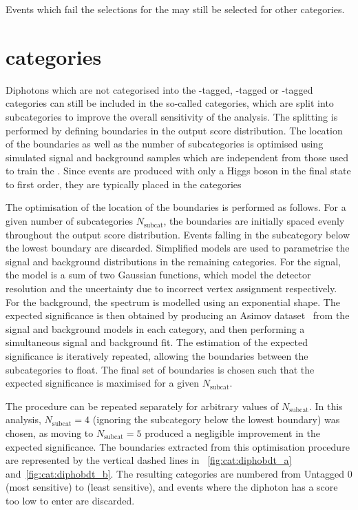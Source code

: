 Events which fail the selections for the \TTHTag\s may still be selected for other categories.

\section{\Untagged categories}
\label{cat:sec:untagged}

Diphotons which are not categorised into the \VBF-tagged, \VH-tagged or \ttH-tagged categories can still be included in the so-called \Untagged categories, which are split into subcategories to improve the overall sensitivity of the analysis. The splitting is performed by defining boundaries in the \DiPhoBdt output score distribution. The location of the boundaries as well as the number of subcategories is optimised using simulated signal and background samples which are independent from those used to train the \DiPhoBdt. Since \ggH events are produced with only a Higgs boson in the final state to first order, they are typically placed in the \Untagged categories

The optimisation of the location of the boundaries is performed as follows. For a given number of subcategories $N_\text{subcat}$, the boundaries are initially spaced evenly throughout the \DiPhoBdt output score distribution. Events falling in the subcategory below the lowest boundary are discarded. Simplified models are used to parametrise the signal and background \mgg distributions in the remaining categories. For the signal, the model is a sum of two Gaussian functions, which model the detector resolution and the uncertainty due to incorrect vertex assignment respectively. For the background, the \mgg spectrum is modelled using an exponential shape. The expected significance is then obtained by producing an Asimov dataset~\cite{Cowan:2010js} from the signal and background models in each category, and then performing a simultaneous signal and background fit. The estimation of the expected significance is iteratively repeated, allowing the boundaries between the subcategories to float. The final set of boundaries is chosen such that the expected significance is maximised for a given $N_\text{subcat}$.

The procedure can be repeated separately for arbitrary values of $N_\text{subcat}$. In this analysis, $N_\text{subcat}=4$ (ignoring the subcategory below the lowest boundary) was chosen, as moving to $N_\text{subcat}=5$ produced a negligible improvement in the expected significance. The boundaries extracted from this optimisation procedure are represented by the vertical dashed lines in \Fig\s~\ref{fig:cat:diphobdt_a} and~\ref{fig:cat:diphobdt_b}. The resulting \Untagged categories are numbered from Untagged 0 (most sensitive) to  (least sensitive), and events where the diphoton has a \DiPhoBdt score too low to enter  are discarded.

